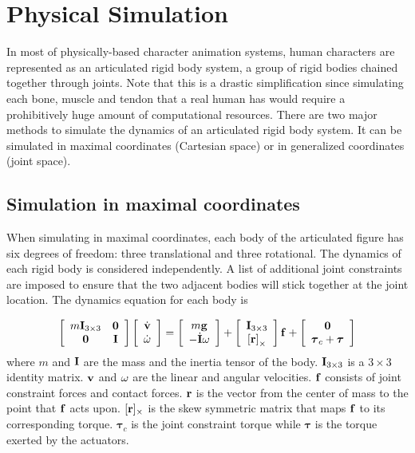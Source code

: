 \section{Physical Simulation}
In most of physically-based character animation systems, human characters are represented as an articulated rigid body system, a group of rigid bodies chained together through joints. Note that this is a drastic simplification since simulating each bone, muscle and tendon that a real human has would require a prohibitively huge amount of computational resources. There are two major methods to simulate the dynamics of an articulated rigid body system. It can be simulated in maximal coordinates (Cartesian space) or in generalized coordinates (joint space).

\subsection{Simulation in maximal coordinates}

When simulating in  maximal coordinates, each body of the articulated figure has six degrees of freedom: three translational and three rotational. The dynamics of each rigid body is considered independently. A list of additional joint constraints are imposed to ensure that the two adjacent bodies will stick together at the joint location. The dynamics equation for each body is 

\begin{equation}
\left[\begin{array}{cc}
m\vc{I}_{3\times3} & \vc{0} \\
\vc{0} & \vc{I}
\end{array}\right]
\left[\begin{array}{c}
\dot{\vc{v}} \\
\dot{\vc{\omega}}
\end{array}\right]=
\left[\begin{array}{c}
m\vc{g} \\
-\dot{\vc{I}}\vc{\omega}
\end{array}\right]
+\left[\begin{array}{c}
\vc{I}_{3\times3}\\
\vc{[r]}_\times
\end{array}\right]
\vc{f}+
\left[\begin{array}{c}
\vc{0}\\
\boldsymbol{\tau}_c+\boldsymbol{\tau}
\end{array}\right]
\label{eq:dynamics}
\end{equation}
where $m$ and $\mathbf{I}$ are the mass and the inertia tensor of the body. $\mathbf{I}_{3\times 3}$ is a $3\times 3$ identity matrix. $\mathbf{v}$ and $\mathbf{\omega}$ are the linear and angular velocities. $\mathbf{f}$ consists of joint constraint forces and contact forces. $\mathbf{r}$ is the vector from the center of mass to the point that $\mathbf{f}$ acts upon. $[\mathbf{r}]_{\times}$ is the skew symmetric matrix that maps $\mathbf{f}$ to its corresponding torque. $\boldsymbol{\tau}_c$ is the joint constraint torque while $\boldsymbol{\tau}$ is the torque exerted by the actuators.

